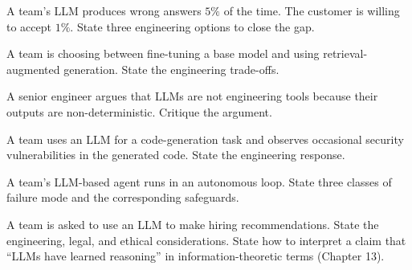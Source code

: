\begin{exercise}
A team's LLM produces wrong answers $5\%$ of the time. The customer is willing to accept $1\%$. State three engineering options to close the gap.
\end{exercise}

\begin{exercise}
A team is choosing between fine-tuning a base model and using retrieval-augmented generation. State the engineering trade-offs.
\end{exercise}

\begin{exercise}
A senior engineer argues that LLMs are not engineering tools because their outputs are non-deterministic. Critique the argument.
\end{exercise}

\begin{exercise}
A team uses an LLM for a code-generation task and observes occasional security vulnerabilities in the generated code. State the engineering response.
\end{exercise}

\begin{exercise}
A team's LLM-based agent runs in an autonomous loop. State three classes of failure mode and the corresponding safeguards.
\end{exercise}

\begin{exercise}
A team is asked to use an LLM to make hiring recommendations. State the engineering, legal, and ethical considerations. State how to interpret a claim that ``LLMs have learned reasoning'' in information-theoretic terms (Chapter 13).
\end{exercise}
